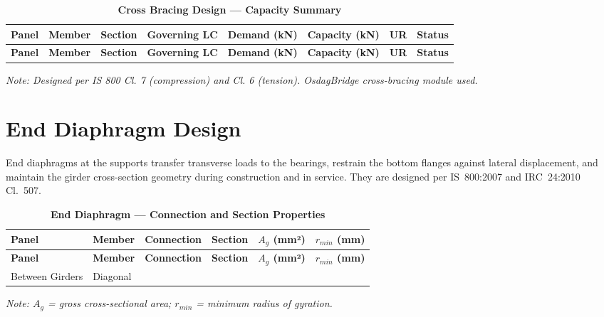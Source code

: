 \documentclass[12pt,a4paper]{report}
\numberwithin{table}{chapter}
\numberwithin{figure}{chapter}
\begin{document}
\vspace{1em}
\begin{longtable}{|C{2.0cm}|L{1.8cm}|C{2.2cm}|C{3.0cm}|C{1.8cm}|C{1.8cm}|C{1.2cm}|C{1.8cm}|}
\caption{\textbf{Cross Bracing Design --- Capacity Summary}}
\hline
{} \textbf{Panel} & \textbf{Member} & \textbf{Section} & \textbf{Governing LC} & \textbf{Demand (kN)} & \textbf{Capacity (kN)} & \textbf{UR} & \textbf{Status} \\[6pt]
\hline
\endfirsthead
\hline
{} \textbf{Panel} & \textbf{Member} & \textbf{Section} & \textbf{Governing LC} & \textbf{Demand (kN)} & \textbf{Capacity (kN)} & \textbf{UR} & \textbf{Status} \\[6pt]
\hline
\endhead

\end{longtable}
\noindent\textit{Note: Designed per IS 800 Cl. 7 (compression) and Cl. 6 (tension). OsdagBridge cross-bracing module used.}

\section{End Diaphragm Design}
\label{sec:end-diaphragm}

End diaphragms at the supports transfer transverse loads to the bearings, restrain the bottom flanges against lateral displacement, and maintain the girder cross-section geometry during construction and in service. They are designed per IS~800:2007 and IRC~24:2010 Cl.~507.

\vspace{1em}

\vspace{0.4em}
\noindent
\setlength{\tabcolsep}{4pt}
\setlength{\LTleft}{0pt}
\setlength{\LTright}{\fill}

\begin{longtable}{|C{2.0cm}|L{2.0cm}|L{2.2cm}|C{2.5cm}|C{2.0cm}|C{2.0cm}|}
\caption{\textbf{End Diaphragm --- Connection and Section Properties}}
\hline
{} \textbf{Panel} & \textbf{Member} & \textbf{Connection} & \textbf{Section} & \textbf{$A_g$ (mm²)} & \textbf{$r_{min}$ (mm)} \\[6pt]
\hline
\endfirsthead
\hline
{} \textbf{Panel} & \textbf{Member} & \textbf{Connection} & \textbf{Section} & \textbf{$A_g$ (mm²)} & \textbf{$r_{min}$ (mm)} \\[6pt]
\hline
\endhead
Between Girders & Diagonal &  &  &  &  \\[6pt]
\hline
\end{longtable}
\noindent\textit{Note: $A_g$ = gross cross-sectional area; $r_{min}$ = minimum radius of gyration.}
\end{document}
